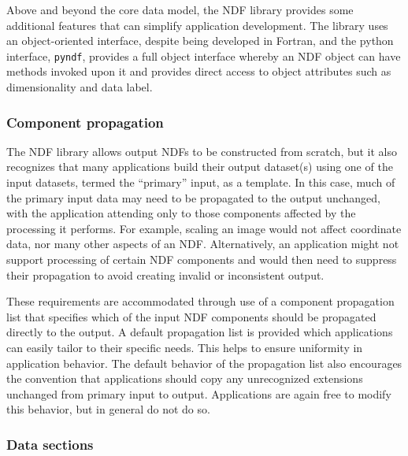 \documentclass[final,authoryear,5p,times,twocolumn]{elsarticle}
\begin{document}
Above and beyond the core data model, the NDF library provides some
additional features that can simplify application development. The
library uses an object-oriented interface, despite being
developed in Fortran, and the python interface, \texttt{pyndf}, provides a full object
interface whereby an NDF object can have methods invoked upon it and
provides direct access to object attributes such as dimensionality and
data label.

\subsubsection{Component propagation}

The NDF library allows output NDFs to be constructed from scratch, but
it also recognizes that many applications build their output dataset(s)
using one of the input datasets, termed the ``primary'' input, as a
template. In this case, much of the primary input data may need to be
propagated to the output unchanged, with the application attending only
to those components affected by the processing it performs. For example,
scaling an image would not affect coordinate data, nor many other
aspects of an NDF. Alternatively, an application might not support
processing of certain NDF components and would then need to suppress
their propagation to avoid creating invalid or inconsistent output.

These requirements are accommodated through use of a component
propagation list that specifies which of the input NDF components should
be propagated directly to the output. A default propagation list is
provided which applications can easily tailor to their specific needs.
This helps to ensure uniformity in application behavior. The default
behavior of the propagation list also encourages the convention that
applications should copy any unrecognized extensions unchanged from
primary input to output. Applications are again free to modify this
behavior, but in general do not do so.

\subsubsection{Data sections}
\end{document}
